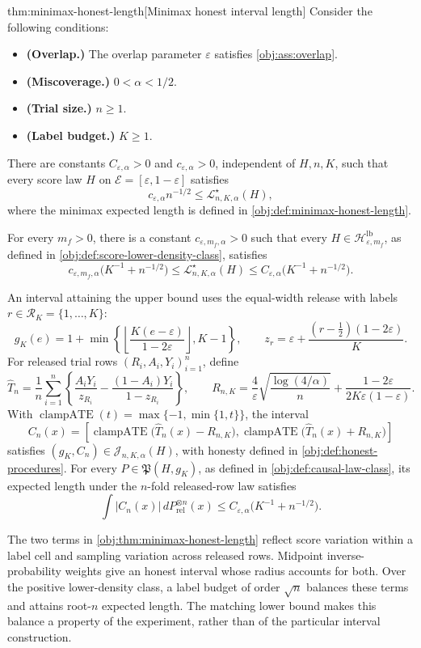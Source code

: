 \begin{theoremv}{thm:minimax-honest-length}[Minimax honest interval length]
Consider the following conditions:
\begin{itemize}
\item \textbf{(Overlap.)} The overlap parameter \(\varepsilon\) satisfies \cref{obj:ass:overlap}.
\item \textbf{(Miscoverage.)} \(0<\alpha<1/2\).
\item \textbf{(Trial size.)} \(n\geq1\).
\item \textbf{(Label budget.)} \(K\geq1\).
\end{itemize}
There are constants \(C_{\varepsilon,\alpha}>0\) and \(c_{\varepsilon,\alpha}>0\), independent of \(H,n,K\), such that every score law \(H\) on \(\mathcal E=[\varepsilon,1-\varepsilon]\) satisfies
\[
c_{\varepsilon,\alpha}n^{-1/2}
\leq \mathcal L^\star_{n,K,\alpha}(H),
\]
where the minimax expected length is defined in \cref{obj:def:minimax-honest-length}.

For every \(m_f>0\), there is a constant \(c_{\varepsilon,m_f,\alpha}>0\) such that every \(H\in\mathcal H^{\mathrm{lb}}_{\varepsilon,m_f}\), as defined in \cref{obj:def:score-lower-density-class}, satisfies
\[
c_{\varepsilon,m_f,\alpha}\bigl(K^{-1}+n^{-1/2}\bigr)
\leq \mathcal L^\star_{n,K,\alpha}(H)
\leq C_{\varepsilon,\alpha}\bigl(K^{-1}+n^{-1/2}\bigr).
\]

An interval attaining the upper bound uses the equal-width release with labels \(r\in\mathcal R_K=\{1,\ldots,K\}\):
\[
g_K(e)=1+\min\left\{\left\lfloor\frac{K(e-\varepsilon)}{1-2\varepsilon}\right\rfloor,K-1\right\},
\qquad
z_r=\varepsilon+\frac{(r-\tfrac12)(1-2\varepsilon)}{K}.
\]
For released trial rows \((R_i,A_i,Y_i)_{i=1}^n\), define
\[
\widehat T_n=\frac1n\sum_{i=1}^n
\left\{\frac{A_iY_i}{z_{R_i}}-\frac{(1-A_i)Y_i}{1-z_{R_i}}\right\},
\qquad
R_{n,K}=\frac4\varepsilon\sqrt{\frac{\log(4/\alpha)}{n}}
+\frac{1-2\varepsilon}{2K\varepsilon(1-\varepsilon)}.
\]
With \(\operatorname{clampATE}(t)=\max\{-1,\min\{1,t\}\}\), the interval
\[
C_n(x)=
\left[
\operatorname{clampATE}\bigl(\widehat T_n(x)-R_{n,K}\bigr),
\operatorname{clampATE}\bigl(\widehat T_n(x)+R_{n,K}\bigr)
\right]
\]
satisfies \((g_K,C_n)\in\mathcal J_{n,K,\alpha}(H)\), with honesty defined in \cref{obj:def:honest-procedures}. For every \(P\in\mathfrak P(H,g_K)\), as defined in \cref{obj:def:causal-law-class}, its expected length under the \(n\)-fold released-row law satisfies
\[
\int |C_n(x)|\,dP_{\mathrm{rel}}^{\otimes n}(x)
\leq C_{\varepsilon,\alpha}\bigl(K^{-1}+n^{-1/2}\bigr).
\]
\end{theoremv}

The two terms in \cref{obj:thm:minimax-honest-length} reflect score variation within a label cell and sampling variation across released rows. Midpoint inverse-probability weights give an honest interval whose radius accounts for both. Over the positive lower-density class, a label budget of order \(\sqrt n\) balances these terms and attains root-\(n\) expected length. The matching lower bound makes this balance a property of the experiment, rather than of the particular interval construction.
